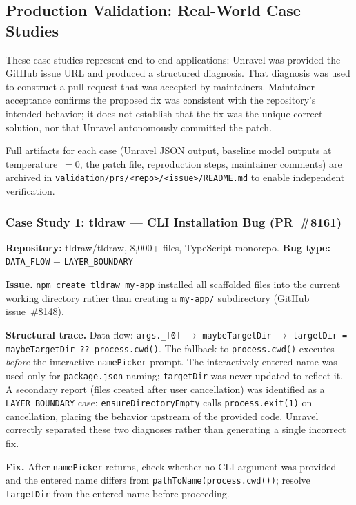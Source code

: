 \documentclass[12pt,a4paper]{article}
\newcommand{\code}[1]{\texttt{\small #1}}
\begin{document}
\subsection{Production Validation: Real-World Case Studies}

These case studies represent end-to-end applications: Unravel was provided the GitHub
issue URL and produced a structured diagnosis. That diagnosis was used to construct a
pull request that was accepted by maintainers. Maintainer acceptance confirms the proposed
fix was consistent with the repository's intended behavior; it does not establish that
the fix was the unique correct solution, nor that Unravel autonomously committed the patch.

Full artifacts for each case (Unravel JSON output, baseline model outputs at
temperature~$=0$, the patch file, reproduction steps, maintainer comments) are archived
in \code{validation/prs/<repo>/<issue>/README.md} to enable independent verification.

\subsubsection{Case Study 1: tldraw — CLI Installation Bug (PR~\#8161)}

\textbf{Repository:} tldraw/tldraw, 8,000+ files, TypeScript monorepo.
\quad\textbf{Bug type:} \code{DATA\_FLOW} + \code{LAYER\_BOUNDARY}

\textbf{Issue.} \code{npm create tldraw my-app} installed all scaffolded files into the
current working directory rather than creating a \code{my-app/} subdirectory (GitHub
issue~\#8148).

\textbf{Structural trace.} Data flow: \code{args.\_[0]} $\to$ \code{maybeTargetDir} $\to$
\code{targetDir = maybeTargetDir ?? process.cwd()}. The fallback to \code{process.cwd()}
executes \textit{before} the interactive \code{namePicker} prompt. The interactively entered
name was used only for \code{package.json} naming; \code{targetDir} was never updated to
reflect it. A secondary report (files created after user cancellation) was identified as a
\code{LAYER\_BOUNDARY} case: \code{ensureDirectoryEmpty} calls \code{process.exit(1)} on
cancellation, placing the behavior upstream of the provided code. Unravel correctly
separated these two diagnoses rather than generating a single incorrect fix.

\textbf{Fix.} After \code{namePicker} returns, check whether no CLI argument was provided
and the entered name differs from \code{pathToName(process.cwd())}; resolve \code{targetDir}
from the entered name before proceeding.
\end{document}
